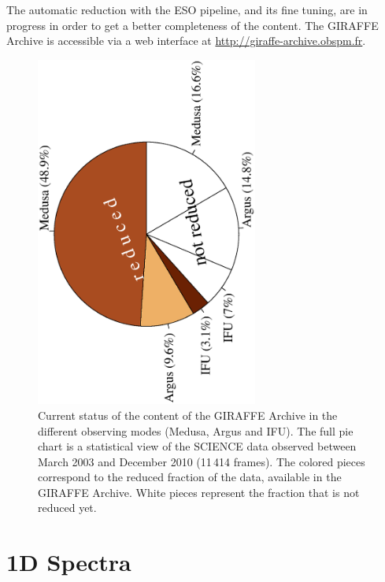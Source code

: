  The automatic reduction with the ESO pipeline, and its fine tuning, are in progress in order to get a better completeness of the content. The GIRAFFE Archive is accessible via a web interface at \url{http://giraffe-archive.obspm.fr}.

\begin{figure}[!ht]
\begin{center}
    \includegraphics[angle=-90,width=0.65\textwidth]{part6/Royer_P63/P63_f1.eps}
\end{center}
\caption{Current status of the content of the GIRAFFE Archive in the different observing modes (Medusa, Argus and IFU). The full pie chart is a statistical view of the SCIENCE data observed between March 2003 and December 2010 (11\,414 frames). The colored pieces correspond to the reduced fraction of the data, available in the GIRAFFE Archive. White pieces represent the fraction that is not reduced yet.
}
\label{camembert}
\end{figure}


\section{1D Spectra}

